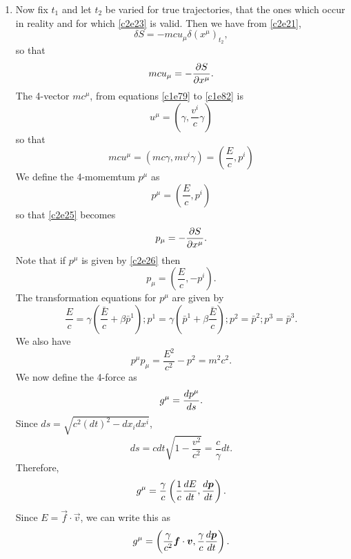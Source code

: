 \begin{enumerate}
\item Now fix $t_1$ and let $t_2$ be varied for true trajectories, that the ones
which occur in reality and for which \eqref{c2e23} is valid. Then we have from
\eqref{c2e21},
\begin{equation}\label{c2e24}
\delta S = -mcu_\mu \delta (x^\mu)_{t_2},
\end{equation}
so that
\begin{equation}\label{c2e25}
mcu_\mu = -\frac{\partial{S}}{\partial{x^\mu}}.
\end{equation}
The 4-vector $mc^\mu$, from equations \eqref{c1e79} to \eqref{c1e82} is
\[
u^\mu = \left(\gamma, \frac{v^i}{c}\gamma\right)
\]
so that
\[
mcu^\mu = \left(mc\gamma, mv^i\gamma\right) = \left(\frac{E}{c}, p^i\right)
\]
We define the 4-momemtum $p^\mu$ as
\begin{equation}\label{c2e26}
p^\mu = \left(\frac{E}{c}, p^i\right)
\end{equation}
so that \eqref{c2e25} becomes
\begin{equation}\label{c2e27}
p_\mu = -\frac{\partial{S}}{\partial{x^\mu}}.
\end{equation}
Note that if $p^\mu$ is given by \eqref{c2e26} then
\begin{equation}\label{c2e28}
p_\mu = \left(\frac{E}{c}, -p^i\right).
\end{equation}
The transformation equations for $p^\mu$ are given by
\begin{equation}\label{c2e29}
\frac{E}{c} = \gamma\left(\frac{\bar{E}}{c} + \beta\bar{p}^1\right);
p^1 = \gamma\left(\bar{p}^1 + \beta\frac{\bar{E}}{c}\right); p^2 = \bar{p}^2;
p^3 = \bar{p}^3.
\end{equation}
We also have
\begin{equation}\label{c2e30}
p^\mu p_\mu = \frac{E^2}{c^2} - p^2 = m^2c^2.
\end{equation}
We now define the 4-force as 
\begin{equation}\label{c2e31}
g^\mu = \frac{d{p^\mu}}{d{s}}.
\end{equation}
Since $ds = \sqrt{c^2(dt)^2 - dx_i dx^i}$,
\begin{equation}\label{c2e32}
ds = cdt\sqrt{1 - \frac{v^2}{c^2}} = \frac{c}{\gamma}dt.
\end{equation}
Therefore,
\[
g^\mu = \frac{\gamma}{c}\left(\frac{1}{c}\frac{d{E}}{d{t}}, \frac{d{\boldsymbol{p}}}{d{t}}\right).
\]
Since $E = \vec{f}\cdot\vec{v}$, we can write this as
\begin{equation}\label{c2e33}
g^\mu = \left(\frac{\gamma}{c^2}\boldsymbol{f}\cdot\boldsymbol{v}, \frac{\gamma}{c}\frac{d{\boldsymbol{p}}}{d{t}}\right).
\end{equation}


\end{enumerate}
